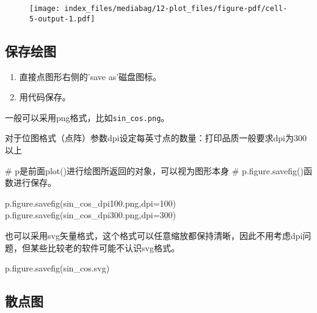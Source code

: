 \documentclass[
  letterpaper,
  DIV=11,
  numbers=noendperiod]{scrreprt}
\newenvironment{Shaded}{\begin{snugshade}}{\end{snugshade}}
\newcommand{\CommentTok}[1]{\textcolor[rgb]{0.37,0.37,0.37}{#1}}
\newcommand{\DecValTok}[1]{\textcolor[rgb]{0.68,0.00,0.00}{#1}}
\newcommand{\NormalTok}[1]{\textcolor[rgb]{0.00,0.23,0.31}{#1}}
\newcommand{\OperatorTok}[1]{\textcolor[rgb]{0.37,0.37,0.37}{#1}}
\newcommand{\StringTok}[1]{\textcolor[rgb]{0.13,0.47,0.30}{#1}}
\providecommand{\tightlist}{%
  \setlength{\itemsep}{0pt}\setlength{\parskip}{0pt}}\usepackage{longtable,booktabs,array}
\begin{document}
\begin{figure}[H]

{\centering \texttt{[image: index\_files/mediabag/12-plot\_files/figure-pdf/cell-5-output-1.pdf]}

}

\end{figure}

\hypertarget{ux4fddux5b58ux7ed8ux56fe}{%
\subsection{保存绘图}\label{ux4fddux5b58ux7ed8ux56fe}}

\begin{enumerate}
\def\labelenumi{\arabic{enumi}.}
\tightlist
\item
  直接点图形右侧的'save as'磁盘图标。
\item
  用代码保存。
\end{enumerate}

一般可以采用png格式，比如\texttt{sin\_cos.png}。

对于位图格式（点阵）参数dpi设定每英寸点的数量：打印品质一般要求dpi为300以上

\begin{Shaded}
\begin{Highlighting}[]
\CommentTok{\# p是前面plot()进行绘图所返回的对象，可以视为图形本身}
\CommentTok{\# p.figure.savefig()函数进行保存。}

\NormalTok{p.figure.savefig(}\StringTok{\textquotesingle{}sin\_cos\_dpi100.png\textquotesingle{}}\NormalTok{,dpi}\OperatorTok{=}\DecValTok{100}\NormalTok{)}
\NormalTok{p.figure.savefig(}\StringTok{\textquotesingle{}sin\_cos\_dpi300.png\textquotesingle{}}\NormalTok{,dpi}\OperatorTok{=}\DecValTok{300}\NormalTok{)}
\end{Highlighting}
\end{Shaded}

也可以采用svg矢量格式，这个格式可以任意缩放都保持清晰，因此不用考虑dpi问题，但某些比较老的软件可能不认识svg格式。

\begin{Shaded}
\begin{Highlighting}[]
\NormalTok{p.figure.savefig(}\StringTok{\textquotesingle{}sin\_cos.svg\textquotesingle{}}\NormalTok{)}
\end{Highlighting}
\end{Shaded}

\hypertarget{ux6563ux70b9ux56fe}{%
\subsection{散点图}\label{ux6563ux70b9ux56fe}}
\end{document}
